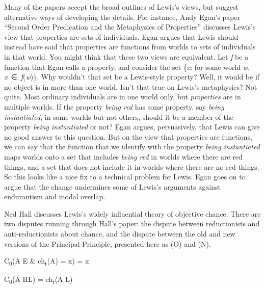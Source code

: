 \documentclass[
  11pt,
  letterpaper,
  DIV=11,
  numbers=noendperiod,
  twoside]{scrartcl}
\providecommand{\tightlist}{%
  \setlength{\itemsep}{0pt}\setlength{\parskip}{0pt}}
\begin{document}
Many of the papers accept the broad outlines of Lewis's views, but
suggest alternative ways of developing the details. For instance, Andy
Egan's paper ``Second Order Predication and the Metaphysics of
Properties'' discusses Lewis's view that properties are sets of
individuals. Egan argues that Lewis should instead have said that
properties are functions from worlds to sets of individuals in that
world. You might think that these two views are equivalent. Let \emph{f}
be a function that Egan calls a property, and consider the set
\{\emph{x}: for some world \emph{w}, \emph{x}~∈~\emph{f}(\emph{w})\}.
Why wouldn't that set be a Lewis-style property? Well, it would be if no
object is in more than one world. Isn't that true on Lewis's
metaphysics? Not quite. Most ordinary individuals are in one world only,
but \emph{properties} are in multiple worlds. If the property
\emph{being red} has some property, say \emph{being instantiated}, in
some worlds but not others, should it be a member of the property
\emph{being instantiated} or not? Egan argues, persuasively, that Lewis
can give no good answer to this question. But on the view that
properties are functions, we can say that the function that we identify
with the property \emph{being instantiated} maps worlds onto a set that
includes \emph{being red} in worlds where there are red things, and a
set that does not include it in worlds where there are no red things. So
this looks like a nice fix to a technical problem for Lewis. Egan goes
on to argue that the change undermines some of Lewis's arguments against
endurantism and modal overlap.

Ned Hall discusses Lewis's widely influential theory of objective
chance. There are two disputes running through Hall's paper: the dispute
between reductionists and anti-reductionists about chance, and the
dispute between the old and new versions of the Principal Principle,
presented here as (O) and (N).

\begin{description}
\tightlist
\item[(O)]
C\textsubscript{0}(A \textbar{} E \& ch\textsubscript{t}(A) = x) = x
\item[(N)]
C\textsubscript{0}(A \textbar{} HL) = ch\textsubscript{t}(A \textbar{}
L)
\end{description}
\end{document}
